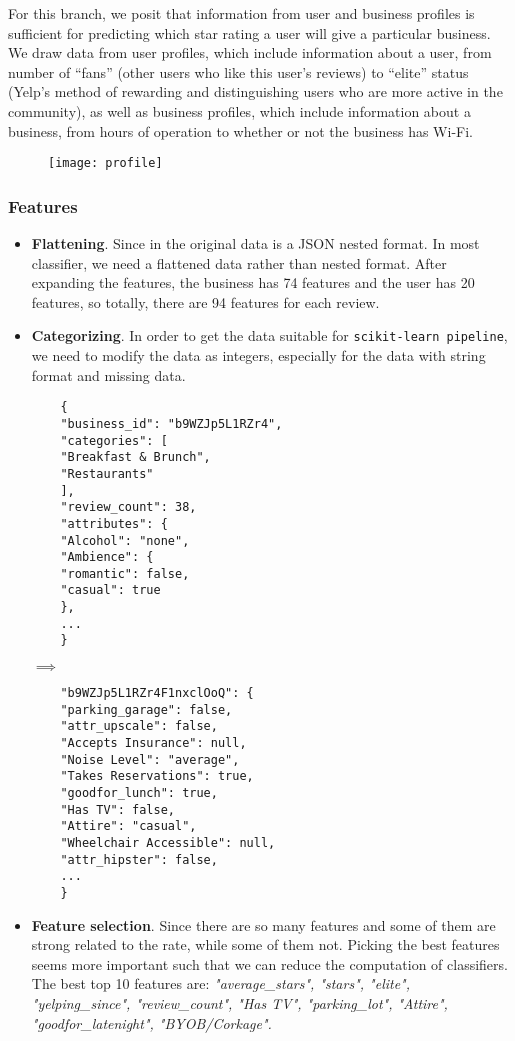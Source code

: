 For this branch, we posit that information from user and business profiles is sufficient for predicting which star rating a user will give a particular business. We draw data from user profiles, which include information about a user, from number of ``fans'' (other users who like this user's reviews) to ``elite'' status (Yelp's method of rewarding and distinguishing users who are more active in the community), as well as business profiles, which include information about a business, from hours of operation to whether or not the business has Wi-Fi.
\begin{figure}[h]
\centering
\texttt{[image: profile]}
\caption{}
\label{fig:profile}
\end{figure}
\subsubsection{Features}
\begin{itemize}
  \item \textbf{Flattening}. Since in the original data is a JSON nested format. In most classifier, we need a flattened data rather than nested format. After expanding the features, the business has 74 features and the user has 20 features, so totally, there are 94 features for each review.
  \item \textbf{Categorizing}. In order to get the data suitable for \texttt{scikit-learn pipeline}, we need to modify the data as integers, especially for the data with string format and missing data. 
  \\
  \begin{minipage}{0.42\textwidth}
  	\begin{verbatim}
  	{
  	"business_id": "b9WZJp5L1RZr4",
  	"categories": [
  	"Breakfast & Brunch",
  	"Restaurants"
  	],
  	"review_count": 38,
  	"attributes": {
  	"Alcohol": "none",
  	"Ambience": {
  	"romantic": false,
  	"casual": true
  	},
  	...
  	}
  	\end{verbatim}
  \end{minipage}%
  \hfill $ \implies $
  \begin{minipage}{0.42\textwidth}
  	
  	\begin{verbatim}
  	"b9WZJp5L1RZr4F1nxclOoQ": {
  	"parking_garage": false, 
  	"attr_upscale": false, 
  	"Accepts Insurance": null, 
  	"Noise Level": "average", 
  	"Takes Reservations": true, 
  	"goodfor_lunch": true, 
  	"Has TV": false, 
  	"Attire": "casual", 
  	"Wheelchair Accessible": null, 
  	"attr_hipster": false, 
  	...
  	}
  	\end{verbatim}
  \end{minipage}%
  \item \textbf{Feature selection}. Since there are so many features and some of them are strong related to the rate, while some of them not. Picking the best features seems more important such that we can reduce the computation of classifiers. The best top 10 features are: \textit{"average\_stars", "stars", "elite", "yelping\_since", "review\_count", "Has TV", "parking\_lot", "Attire", "goodfor\_latenight", "BYOB/Corkage".}
  
\end{itemize}

